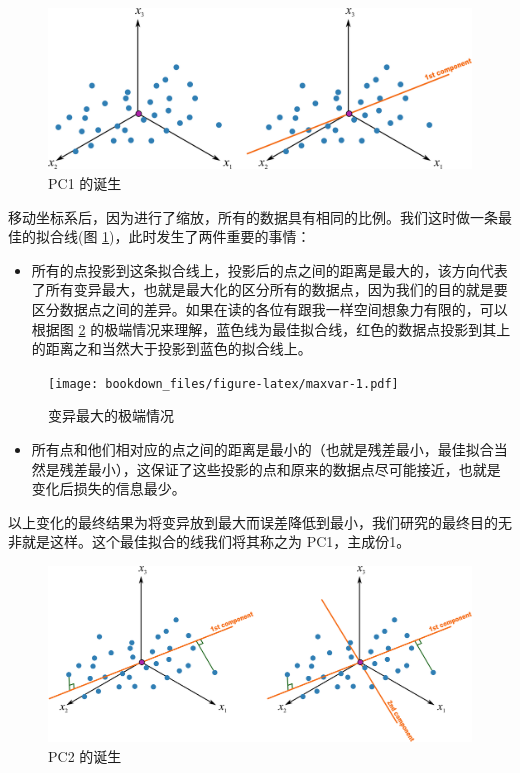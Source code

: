 \documentclass[
]{krantz}
\providecommand{\tightlist}{%
  \setlength{\itemsep}{0pt}\setlength{\parskip}{0pt}}
\begin{document}
\begin{figure}
\includegraphics[width=1\linewidth]{images/pc2} \caption{PC1 的诞生}\label{fig:pc2}
\end{figure}

移动坐标系后，因为进行了缩放，所有的数据具有相同的比例。我们这时做一条最佳的拟合线(图 \ref{fig:pc2})，此时发生了两件重要的事情：

\begin{itemize}
\tightlist
\item
  所有的点投影到这条拟合线上，投影后的点之间的距离是最大的，该方向代表了所有变异最大，也就是最大化的区分所有的数据点，因为我们的目的就是要区分数据点之间的差异。如果在读的各位有跟我一样空间想象力有限的，可以根据图 \ref{fig:maxvar} 的极端情况来理解，蓝色线为最佳拟合线，红色的数据点投影到其上的距离之和当然大于投影到蓝色的拟合线上。
\end{itemize}

\begin{figure}
\centering
\texttt{[image: bookdown\_files/figure-latex/maxvar-1.pdf]}
\caption{\label{fig:maxvar}变异最大的极端情况}
\end{figure}

\begin{itemize}
\tightlist
\item
  所有点和他们相对应的点之间的距离是最小的（也就是残差最小，最佳拟合当然是残差最小），这保证了这些投影的点和原来的数据点尽可能接近，也就是变化后损失的信息最少。
\end{itemize}

以上变化的最终结果为将变异放到最大而误差降低到最小，我们研究的最终目的无非就是这样。这个最佳拟合的线我们将其称之为 PC1，主成份1。

\begin{figure}
\includegraphics[width=1\linewidth]{images/pc3} \caption{PC2 的诞生}\label{fig:pc3}
\end{figure}
\end{document}
